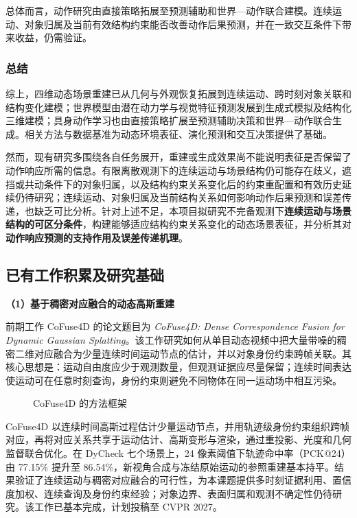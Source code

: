 总体而言，动作研究由直接策略拓展至预测辅助和世界—动作联合建模。连续运动、对象归属及当前有效结构约束能否改善动作后果预测，并在一致交互条件下带来收益，仍需验证。


\subsubsection{总结}

综上，四维动态场景重建已从几何与外观恢复拓展到连续运动、跨时刻对象关联和结构变化建模；世界模型由潜在动力学与视觉特征预测发展到生成式模拟及结构化三维建模；具身动作学习也由直接策略扩展至预测辅助决策和世界—动作联合生成。相关方法与数据基准为动态环境表征、演化预测和交互决策提供了基础。

然而，现有研究多围绕各自任务展开，重建或生成效果尚不能说明表征是否保留了动作响应所需的信息。有限离散观测下的连续运动与场景结构仍可能存在歧义，遮挡或共动条件下的对象归属，以及结构约束关系变化后的约束重配置和有效历史延续仍待研究；连续运动、对象归属及当前结构关系如何影响动作后果预测和误差传递，也缺乏可比分析。针对上述不足，本项目拟研究不完备观测下\textbf{连续运动与场景结构的可区分条件}，构建能够适应结构约束关系变化的动态场景表征，并分析其对\textbf{动作响应预测的支持作用及误差传递机理}。

\subsection{已有工作积累及研究基础}

\noindent\textbf{（1）基于稠密对应融合的动态高斯重建}

前期工作 CoFuse4D 的论文题目为 \textit{CoFuse4D: Dense Correspondence Fusion for Dynamic Gaussian Splatting}。该工作研究如何从单目动态视频中把大量带噪的稠密二维对应融合为少量连续时间运动节点的估计，并以对象身份约束跨帧关联。其核心思想是：运动自由度应少于观测数量，但观测证据应尽量保留；连续时间表达使运动可在任意时刻查询，身份约束则避免不同物体在同一运动场中相互污染。


\begin{figure}[H]
  \centering
  
  \caption{CoFuse4D 的方法框架}
  \label{fig:cofuse4d-method}
\end{figure}

CoFuse4D 以连续时间高斯过程估计少量运动节点，并用轨迹级身份约束组织跨帧对应，再将对应关系共享于运动估计、高斯变形与渲染，通过重投影、光度和几何监督联合优化。在 DyCheck 七个场景上，24 像素阈值下轨迹命中率（PCK@24）由 77.15\% 提升至 86.54\%，新视角合成与冻结原始运动的参照重建基本持平。结果验证了连续运动与稠密对应融合的可行性，为本课题提供多时刻证据利用、置信度加权、连续查询及身份约束经验；对象边界、表面归属和观测不确定性仍待研究。该工作已基本完成，计划投稿至 CVPR 2027。

